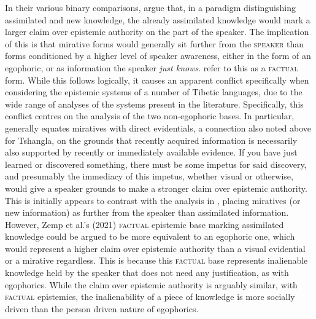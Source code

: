 In their various binary comparisons,  argue that, in a paradigm distinguishing assimilated and new knowledge, the already assimilated knowledge would mark a larger claim over epistemic authority on the part of the speaker. The implication of this is that mirative forms would generally sit further from the \textsc{speaker} than forms conditioned by a higher level of speaker awareness, either in the form of an egophoric, or as information the speaker \textit{just knows}.  refer to this as a \textsc{factual} form. While this follows logically, it causes an apparent conflict specifically when considering the epistemic systems of a number of Tibetic languages, due to the wide range of analyses of the systems present in the literature. Specifically, this conflict centres on the analysis of the two non-egophoric bases. In particular,  generally equates miratives with direct evidentials, a connection also noted above for Tshangla, on the grounds that recently acquired information is necessarily also supported by recently or immediately available evidence. If you have just learned or discovered something, there must be some impetus for said discovery, and presumably the immediacy of this impetus, whether visual or otherwise, would give a speaker grounds to make a stronger claim over epistemic authority. This is initially appears to contrast with the analysis in , placing miratives (or new information) as further from the speaker than assimilated information. However, Zemp et al.'s (2021) \textsc{factual} epistemic base marking assimilated knowledge could be argued to be more equivalent to an egophoric one, which would represent a higher claim over epistemic authority than a visual evidential or a mirative regardless. This is because this \textsc{factual} base represents inalienable knowledge held by the speaker that does not need any justification, as with egophorics. While the claim over epistemic authority is arguably similar, with \textsc{factual} epistemics, the inalienability of a piece of knowledge is more socially driven than the person driven nature of egophorics.


